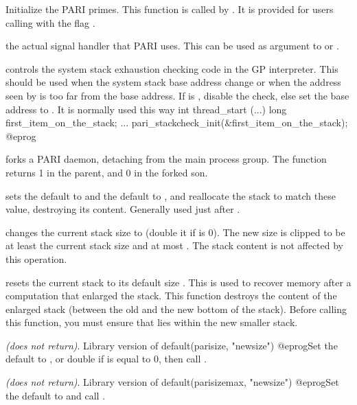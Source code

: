  Initialize the PARI
primes. This function is called by .
It is provided for users calling  with the
flag .

 the actual signal handler that
PARI uses. This can be used as argument to  or
.

 controls the system stack
exhaustion checking code in the GP interpreter. This should be used when the
system stack base address change or when the address seen by 
is too far from the base address. If  is , disable the
check, else set the base address to . It is normally used this
way
\bprog
int thread_start (...)
{
  long first_item_on_the_stack;
  ...
  pari_stackcheck_init(&first_item_on_the_stack);
}
@eprog

 forks a PARI daemon, detaching from the main
process group. The function returns 1 in the parent, and 0 in the
forked son.

sets the default  to  and the
default  to , and reallocate the
stack to match these value, destroying its content.
Generally used just after .

changes the current stack size to 
(double it if  is 0).
The new size is clipped to be at least the current stack size and
at most . The stack content is not affected
by this operation.

resets the current stack to its default size . This is
used to recover memory after a computation that enlarged the stack.
This function destroys the content of the enlarged stack (between
the old and the new bottom of the stack).
Before calling this function, you must ensure that  lies
within the new smaller stack.

\emph{(does not return)}. Library version of
\bprog
  default(parisize, "newsize")
@eprog\noindent Set the default  to , or double
 if  is equal to 0, then call
.

\emph{(does not return)}. Library version of
\bprog
  default(parisizemax, "newsize")
@eprog\noindent Set the default  to  and call
.

